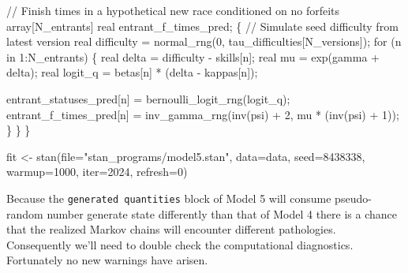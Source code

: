 \documentclass[
  letterpaper,
  DIV=11,
  numbers=noendperiod]{scrartcl}
\newenvironment{Shaded}{\begin{snugshade}}{\end{snugshade}}
\newcommand{\AttributeTok}[1]{\textcolor[rgb]{0.40,0.45,0.13}{#1}}
\newcommand{\CommentTok}[1]{\textcolor[rgb]{0.37,0.37,0.37}{#1}}
\newcommand{\ControlFlowTok}[1]{\textcolor[rgb]{0.00,0.23,0.31}{#1}}
\newcommand{\DataTypeTok}[1]{\textcolor[rgb]{0.68,0.00,0.00}{#1}}
\newcommand{\DecValTok}[1]{\textcolor[rgb]{0.68,0.00,0.00}{#1}}
\newcommand{\FunctionTok}[1]{\textcolor[rgb]{0.28,0.35,0.67}{#1}}
\newcommand{\NormalTok}[1]{\textcolor[rgb]{0.00,0.23,0.31}{#1}}
\newcommand{\OtherTok}[1]{\textcolor[rgb]{0.00,0.23,0.31}{#1}}
\newcommand{\SpecialCharTok}[1]{\textcolor[rgb]{0.37,0.37,0.37}{#1}}
\newcommand{\StringTok}[1]{\textcolor[rgb]{0.13,0.47,0.30}{#1}}
\begin{document}
\begin{codelisting}
\begin{Shaded}
\begin{Highlighting}[]
  \CommentTok{// Finish times in a hypothetical new race conditioned on no forfeits}
  \DataTypeTok{array}\NormalTok{[N\_entrants] }\DataTypeTok{real}\NormalTok{ entrant\_f\_times\_pred;}
\NormalTok{  \{}
    \CommentTok{// Simulate seed difficulty from latest version}
    \DataTypeTok{real}\NormalTok{ difficulty = normal\_rng(}\DecValTok{0}\NormalTok{, tau\_difficulties[N\_versions]);}
    \ControlFlowTok{for}\NormalTok{ (n }\ControlFlowTok{in} \DecValTok{1}\NormalTok{:N\_entrants) \{}
      \DataTypeTok{real}\NormalTok{ delta = difficulty {-} skills[n];}
      \DataTypeTok{real}\NormalTok{ mu = exp(gamma + delta);}
      \DataTypeTok{real}\NormalTok{ logit\_q = betas[n] * (delta {-} kappas[n]);}

\NormalTok{      entrant\_statuses\_pred[n] = bernoulli\_logit\_rng(logit\_q);}
\NormalTok{      entrant\_f\_times\_pred[n] = inv\_gamma\_rng(inv(psi) + }\DecValTok{2}\NormalTok{,}
\NormalTok{                                              mu * (inv(psi) + }\DecValTok{1}\NormalTok{));}
\NormalTok{    \}}
\NormalTok{  \}}
\NormalTok{\}}
\end{Highlighting}
\end{Shaded}

\end{codelisting}

\begin{Shaded}
\begin{Highlighting}[]
\NormalTok{fit }\OtherTok{\textless{}{-}} \FunctionTok{stan}\NormalTok{(}\AttributeTok{file=}\StringTok{"stan\_programs/model5.stan"}\NormalTok{,}
            \AttributeTok{data=}\NormalTok{data, }\AttributeTok{seed=}\DecValTok{8438338}\NormalTok{,}
            \AttributeTok{warmup=}\DecValTok{1000}\NormalTok{, }\AttributeTok{iter=}\DecValTok{2024}\NormalTok{, }\AttributeTok{refresh=}\DecValTok{0}\NormalTok{)}
\end{Highlighting}
\end{Shaded}

Because the \texttt{generated\ quantities} block of Model 5 will consume
pseudo-random number generate state differently than that of Model 4
there is a chance that the realized Markov chains will encounter
different pathologies. Consequently we'll need to double check the
computational diagnostics. Fortunately no new warnings have arisen.

\begin{Shaded}
\end{Shaded}
\end{document}

